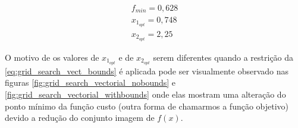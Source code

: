 \begin{equation}
	\label{eq:grid_search_vect_bounds_output}
	\begin{aligned}
		f_{min} = 0,628 \\
		x_{1_{opt}} = 0,748 \\
		x_{2_{opt}} = 2,25
	\end{aligned}
\end{equation}

O motivo de os valores de $x_{1_{opt}}$ e de $x_{2_{opt}}$ serem diferentes quando a restrição
da \cref{eq:grid_search_vect_bounds} é aplicada pode ser visualmente observado nas figuras
\ref{fig:grid_search_vectorial_nobounds} e \ref{fig:grid_search_vectorial_withbounds} onde
elas mostram uma alteração do ponto mínimo da função custo (outra forma de chamarmos a função
objetivo) devido a redução do conjunto imagem de $f(x)$.


